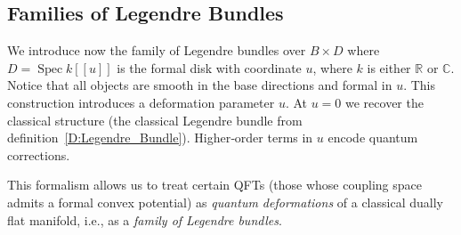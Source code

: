 \documentclass[12pt]{amsart}
\begin{document}
\subsection{Families of Legendre Bundles}\label{sec:families}

We introduce now the family of Legendre bundles over $B\times D$ where $D = \operatorname{Spec} k[[u]]$ is the formal disk with coordinate $u$, where $k$ is either \(\mathbb{R}\) or \(\mathbb{C}\). Notice that all objects are smooth in the base directions and formal in \(u\). This construction introduces a deformation parameter $u$. At $u=0$ we recover the classical structure (the classical Legendre bundle from definition~\ref{D:Legendre_Bundle}). Higher‑order terms in $u$ encode quantum corrections. 


This formalism allows us to treat certain QFTs (those whose coupling space admits a formal convex potential) as {\it quantum deformations} of a classical dually flat manifold, i.e., as a {\it family of Legendre bundles}.
\end{document}
